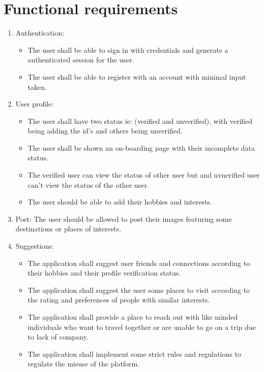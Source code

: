 \documentclass[12pt,a4paper]{report}
\begin{document}
\section{Functional requirements}
\begin{enumerate}
    \item Authentication: 
    \begin{itemize}
        \item The user shall be able to sign in with credentials and generate a authenticated session for the user. 
        \item The user shall be able to register with an account with minimal input taken.
    \end{itemize}

    \item User profile:
    \begin{itemize}
        \item The user shall have two status ie: (verified and unverified), with verified being adding the id's and others being unverified.
        \item The user shall be shown an on-boarding page with their incomplete data status.
        \item The verified user can view the status of other user but and uvnerified user can't view the status of the other user.
        \item The user should be able to add their hobbies and interests.
    \end{itemize}

    \item Post: The user should be allowed to post their images featuring some destinations or places of interests.
    \item Suggestions:
    \begin{itemize}
        \item The application shall suggest user friends and connections according to their hobbies and their profile verification status.
        \item The application shall suggest the user some places to visit according to the rating and preferences of people with similar interests.
        \item The application shall provide a place to reach out with like minded individuals who want to travel together or are unable to go on a trip due to lack of company.
        \item The application shall implement some strict rules and regulations to regulate the misuse of the platform.
    \end{itemize}


\end{enumerate}
\end{document}
